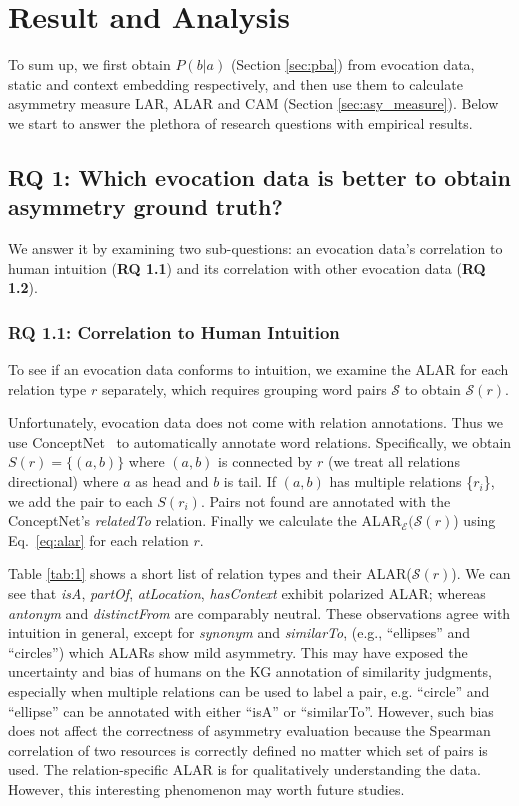\documentclass[letterpaper]{article} %
\begin{document}
\section{Result and Analysis}
\label{sec:exp}
To sum up, we first obtain $P(b|a)$ (Section \ref{sec:pba}) from evocation data, static and context embedding respectively, and then use them to calculate asymmetry measure LAR, ALAR and CAM (Section \ref{sec:asy_measure}). Below we start to answer the plethora of research questions with empirical results.

\subsection{\textbf{RQ 1}: Which evocation data is better to obtain asymmetry ground truth?} 
We answer it by examining two sub-questions: an evocation data's correlation to human intuition (\textbf{RQ 1.1}) and its correlation with other evocation data (\textbf{RQ 1.2}).

\subsubsection{RQ 1.1: Correlation to Human Intuition}
To see if an evocation data conforms to intuition, we examine the ALAR for each relation type $r$ separately, which requires grouping word pairs $\mathcal{S}$ to obtain $\mathcal{S}(r)$.

Unfortunately, evocation data does not come with relation annotations. Thus we use ConceptNet~\citep{speer2017conceptnet} to automatically annotate word relations. Specifically, we obtain $S(r)=\{(a,b)\}$ where $(a,b)$ is connected by $r$ (we treat all relations directional) where $a$ as head and $b$ is tail. If $(a,b)$ has multiple relations \{$r_i$\}, we add the pair to each $S(r_i)$. Pairs not found are annotated with the ConceptNet's \textit{relatedTo} relation. 
Finally we calculate the ALAR$_\mathcal{E}(\mathcal{S}(r)$) using Eq.~\ref{eq:alar}
for each relation $r$. 



Table \ref{tab:1} shows a short list of relation types and their ALAR($\mathcal{S}(r)$). We can see that \textit{isA}, \textit{partOf}, \textit{atLocation}, \textit{hasContext} exhibit polarized ALAR; whereas \textit{antonym} and \textit{distinctFrom} are comparably neutral. These observations agree with intuition in general, except for \textit{synonym} and \textit{similarTo}, (e.g., ``ellipses'' and ``circles'') which ALARs show mild asymmetry. This may have exposed the uncertainty and bias of humans on the KG annotation of similarity judgments, especially when 
multiple relations can be used to label a pair, e.g. ``circle'' and ``ellipse'' can be annotated with either ``isA'' or ``similarTo''. However, such bias does not affect the correctness of asymmetry evaluation because the Spearman correlation of two resources is correctly defined no matter which set of pairs is used. 
The relation-specific ALAR is for qualitatively understanding the data. However, this interesting phenomenon may worth future studies.
\end{document}
